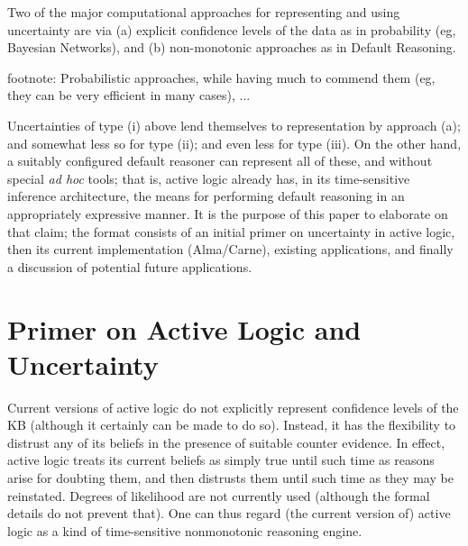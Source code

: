 


Two of the major computational approaches for representing and using
uncertainty are via (a)
explicit confidence levels of the data as in probability (eg, Bayesian
Networks), and (b) non-monotonic approaches as in Default Reasoning.

footnote:
Probabilistic approaches, while having much to commend them (eg, they can
be very efficient in many cases), ...



Uncertainties of type (i)  above lend themselves to
representation by approach (a); and somewhat less so for type (ii);
and even less for type (iii).  On the other hand, a suitably configured
default reasoner can represent all of these, and without special
{\em ad hoc} tools; that is, active logic already has, in its
time-sensitive inference architecture, the means for performing
default reasoning in an appropriately expressive manner. It is the
purpose of this paper to elaborate on that claim; the format consists
of an initial primer on uncertainty in active logic, then its current
implementation (Alma/Carne), existing applications, and finally a
discussion of potential future applications.



\section{Primer on Active Logic and Uncertainty}


Current versions of active logic do not explicitly represent
confidence levels of 
the KB (although it certainly can be made to do so). Instead, it has
the flexibility to distrust any of its beliefs in the presence of
suitable counter evidence. In effect, active logic treats its current
beliefs as simply true
until such time as reasons arise for doubting them, and then
distrusts them until such time as they may be reinstated. Degrees of
likelihood are not currently used (although the formal details
do not prevent that). One can thus regard (the current version of)
active logic as a kind of time-sensitive nonmonotonic reasoning engine.


